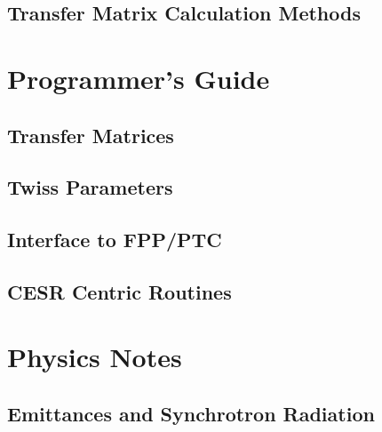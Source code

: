 \documentclass{book}
\begin{document}
\chapter{Transfer Matrix Calculation Methods}


\part{Programmer's Guide}






\chapter{Transfer Matrices}
\chapter{Twiss Parameters}
\chapter{Interface to FPP/PTC}
\chapter{CESR Centric Routines}



\part{Physics Notes}
\chapter{Emittances and Synchrotron Radiation}


\begin{theindex}
\end{theindex}
\end{document}

